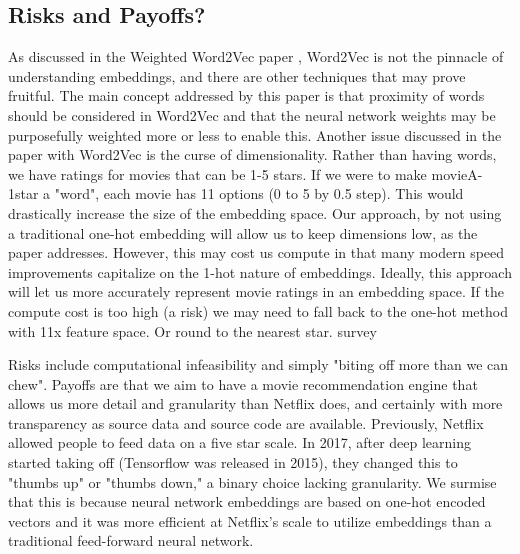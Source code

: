 \subsection{Risks and Payoffs?}

As discussed in the Weighted Word2Vec paper \cite{Chang2017}, Word2Vec is not the pinnacle of understanding embeddings, and there are other techniques that may prove fruitful. The main concept addressed by this paper is that proximity of words should be considered in Word2Vec and that the neural network weights may be purposefully weighted more or less to enable this. Another issue discussed in the paper with Word2Vec is the curse of dimensionality. Rather than having words, we have ratings for movies that can be 1-5 stars. If we were to make movieA-1star a "word", each movie has 11 options (0 to 5 by 0.5 step). This would drastically increase the size of the embedding space. Our approach, by not using a traditional one-hot embedding will allow us to keep dimensions low, as the paper addresses. However, this may cost us compute in that many modern speed improvements capitalize on the 1-hot nature of embeddings. Ideally, this approach will let us more accurately represent movie ratings in an embedding space. If the compute cost is too high (a risk) we may need to fall back to the one-hot method with 11x feature space. Or round to the nearest star. survey

Risks include computational infeasibility and simply "biting off more than we can chew". Payoffs are that we aim to have a movie recommendation engine that allows us more detail and granularity than Netflix does, and certainly with more transparency as source data and source code are available. Previously, Netflix allowed people to feed data on a five star scale. In 2017, after deep learning started taking off (Tensorflow was released in 2015), they changed this to "thumbs up" or "thumbs down," a binary choice lacking granularity. We surmise that this is because neural network embeddings are based on one-hot encoded vectors and it was more efficient at Netflix's scale to utilize embeddings than a traditional feed-forward neural network.